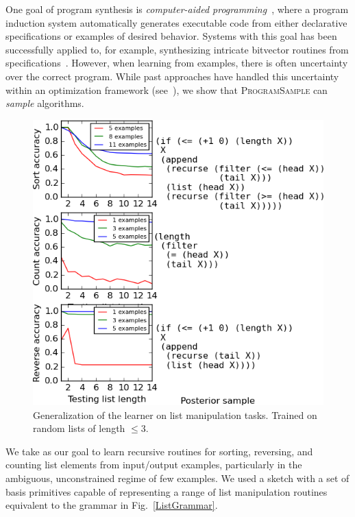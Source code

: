 \documentclass{article}
\newcommand{\theSystem}{\textsc{ProgramSample}}
\begin{document}
One goal of program synthesis is \emph{computer-aided programming}~\cite{solar2008program}, where a program induction system automatically generates executable code from either declarative specifications or examples of desired behavior.
Systems with this goal has been successfully applied to, for example, synthesizing intricate bitvector routines from specifications~\cite{gulwani2011automating}.
However, when learning from examples, there is often uncertainty over the correct program.
While past approaches have handled this uncertainty within an optimization framework (see~\cite{raychev2016learning,ellis2015unsupervised,singh2013automated}),
we show that \theSystem{} can \emph{sample} algorithms.
\begin{figure}\centering
  \begin{minipage}{0.5\textwidth}
  \label{ListGrammar}
  \end{minipage}
  
\vspace{\baselineskip}
\vspace{\baselineskip}

\begin{minipage}{0.5\textwidth}
    \includegraphics[width=\textwidth]{tinyList.png}
  \caption{Generalization of the  learner on list manipulation tasks. Trained on random lists of length $\leq 3$.}
  \label{listCurves}
\end{minipage}
\end{figure}
We take as our goal to learn recursive routines for sorting, reversing, and counting list elements from input/output examples,
particularly in the ambiguous,
unconstrained regime of few examples.
We used a sketch  with a set of basis primitives capable of representing a range of list manipulation routines equivalent to the grammar in Fig.~\ref{ListGrammar}.
\end{document}
